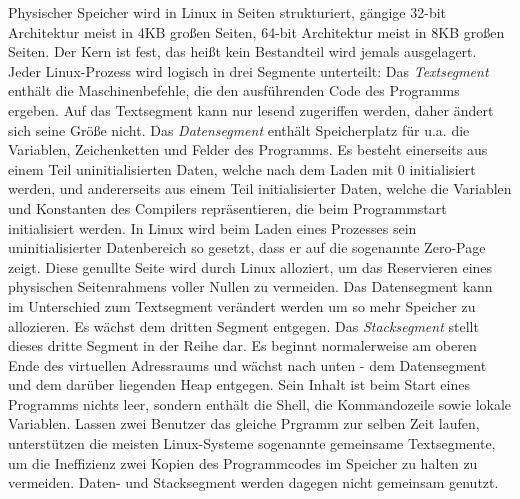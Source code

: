 \documentclass[11pt,a4paper]{article}
\begin{document}
Physischer Speicher wird in Linux in Seiten strukturiert, gängige 32-bit Architektur meist in 4KB großen Seiten, 64-bit Architektur meist in 8KB großen Seiten. Der Kern ist fest, das heißt kein Bestandteil wird jemals ausgelagert.
\newline
Jeder Linux-Prozess wird logisch in drei Segmente unterteilt: 
\newline 
Das \textit{Textsegment} enthält die Maschinenbefehle, die den ausführenden Code des Programms ergeben. Auf das Textsegment kann nur lesend zugeriffen werden, daher ändert sich seine Größe nicht. 
\newline
Das \textit{Datensegment} enthält Speicherplatz für u.a. die Variablen, Zeichenketten und Felder des Programms. Es besteht einerseits aus einem Teil uninitialisierten Daten, welche nach dem Laden mit 0 initialisiert werden, und andererseits aus einem Teil initialisierter Daten, welche die Variablen und Konstanten des Compilers repräsentieren, die beim Programmstart initialisiert werden. In Linux wird beim Laden eines Prozesses sein uninitialisierter Datenbereich so gesetzt, dass er auf die sogenannte Zero-Page zeigt. Diese genullte Seite wird durch Linux alloziert, um das Reservieren eines physischen Seitenrahmens voller Nullen zu vermeiden.  Das Datensegment kann im Unterschied zum Textsegment verändert werden um so mehr Speicher zu allozieren. Es wächst dem dritten Segment entgegen.
\newline
Das \textit{Stacksegment} stellt dieses dritte Segment in der Reihe dar. Es beginnt normalerweise am oberen Ende des virtuellen Adressraums und wächst nach unten - dem Datensegment und dem darüber liegenden Heap entgegen. Sein Inhalt ist beim Start eines Programms nichts leer, sondern enthält die Shell, die Kommandozeile sowie lokale Variablen. 
\newline
Lassen zwei Benutzer das gleiche Prgramm zur selben Zeit laufen, unterstützen die meisten Linux-Systeme sogenannte gemeinsame Textsegmente, um die Ineffizienz zwei Kopien des Programmcodes im Speicher zu halten zu vermeiden. Daten- und Stacksegment werden dagegen nicht gemeinsam genutzt. 

\newpage 
\end{document}
